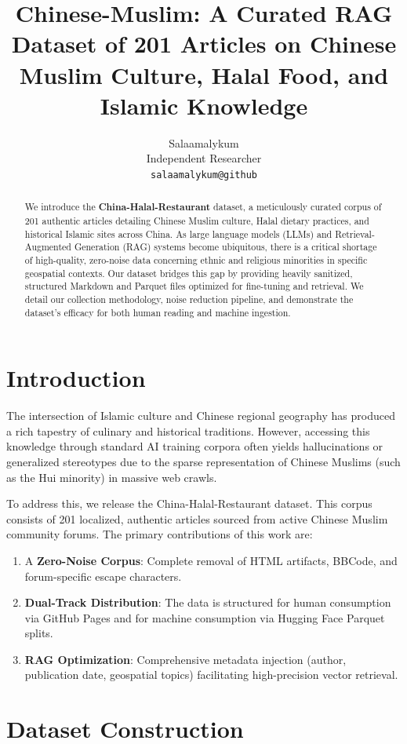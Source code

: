 \documentclass[11pt,a4paper]{article}
\title{Chinese-Muslim: A Curated RAG Dataset of 201 Articles on Chinese Muslim Culture, Halal Food, and Islamic Knowledge}
\author{Salaamalykum \\
  Independent Researcher \\
  \texttt{salaamalykum@github} \\}
\date{}
\begin{document}
\maketitle
\begin{abstract}
We introduce the \textbf{China-Halal-Restaurant} dataset, a meticulously curated corpus of 201 authentic articles detailing Chinese Muslim culture, Halal dietary practices, and historical Islamic sites across China. As large language models (LLMs) and Retrieval-Augmented Generation (RAG) systems become ubiquitous, there is a critical shortage of high-quality, zero-noise data concerning ethnic and religious minorities in specific geospatial contexts. Our dataset bridges this gap by providing heavily sanitized, structured Markdown and Parquet files optimized for fine-tuning and retrieval. We detail our collection methodology, noise reduction pipeline, and demonstrate the dataset's efficacy for both human reading and machine ingestion.
\end{abstract}

\section{Introduction}
The intersection of Islamic culture and Chinese regional geography has produced a rich tapestry of culinary and historical traditions. However, accessing this knowledge through standard AI training corpora often yields hallucinations or generalized stereotypes due to the sparse representation of Chinese Muslims (such as the Hui minority) in massive web crawls.

To address this, we release the China-Halal-Restaurant dataset. This corpus consists of 201 localized, authentic articles sourced from active Chinese Muslim community forums. The primary contributions of this work are:
\begin{enumerate}
    \item A \textbf{Zero-Noise Corpus}: Complete removal of HTML artifacts, BBCode, and forum-specific escape characters.
    \item \textbf{Dual-Track Distribution}: The data is structured for human consumption via GitHub Pages and for machine consumption via Hugging Face Parquet splits.
    \item \textbf{RAG Optimization}: Comprehensive metadata injection (author, publication date, geospatial topics) facilitating high-precision vector retrieval.
\end{enumerate}

\section{Dataset Construction}
\end{document}
